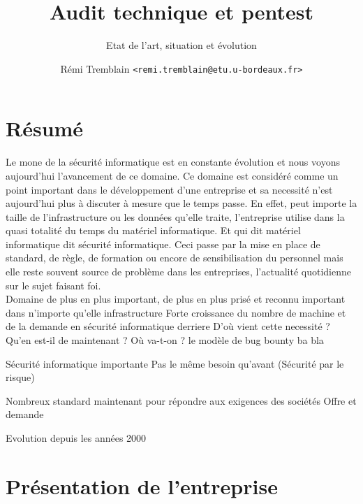 \documentclass[a4paper]{memoir}
\title{Audit technique et pentest}
\subtitle{Etat de l'art, situation et évolution}
\author{Rémi Tremblain \texttt{<remi.tremblain@etu.u-bordeaux.fr>}}
\begin{document}
\frontmatter%
\maketitle
\thispagestyle{empty}





\chapter*{Résumé}


Le mone de la sécurité informatique est en constante évolution et nous voyons aujourd'hui l'avancement de ce domaine.
Ce domaine est considéré comme un point important dans le développement d'une entreprise et sa necessité n'est aujourd'hui plus à discuter à mesure que le temps passe. En effet, peut importe la taille de l'infrastructure ou les données qu'elle traite, l'entreprise utilise dans la quasi totalité du temps du matériel informatique. Et qui dit matériel informatique dit sécurité informatique. Ceci passe par la mise en place de standard, de règle, de formation ou encore de sensibilisation du personnel mais elle reste souvent source de problème dans les entreprises, l'actualité quotidienne sur le sujet faisant foi.\\


Domaine de plus en plus important, de plus en plus prisé et reconnu
important dans n'importe qu'elle infrastructure 
Forte croissance du nombre de machine et de la demande en sécurité informatique derriere 
D'où vient cette necessité ? Qu'en est-il de maintenant ? Où va-t-on ? le modèle de bug bounty ba bla

Sécurité informatique importante
Pas le même besoin qu'avant (Sécurité par le risque)

Nombreux standard maintenant pour répondre aux exigences des sociétés
Offre et demande

Evolution depuis les années 2000


\chapter*{Présentation de l'entreprise}
\end{document}
